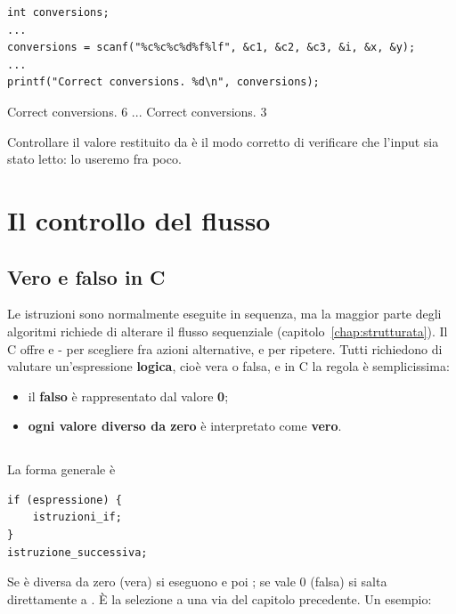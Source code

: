 \begin{affianco}[0.55][c]
\begin{lstlisting}[style=c]
int conversions;
...
conversions = scanf("%c%c%c%d%f%lf", &c1, &c2, &c3, &i, &x, &y);
...
printf("Correct conversions. %d\n", conversions);
\end{lstlisting}
\risultato
\begin{console}
Correct conversions. 6
...
Correct conversions. 3
\end{console}
\end{affianco}

Controllare il valore restituito da  è il modo corretto di
verificare che l'input sia stato letto: lo useremo fra poco.

\section{Il controllo del flusso}

\subsection{Vero e falso in C}

Le istruzioni sono normalmente eseguite in sequenza, ma la maggior parte
degli algoritmi richiede di alterare il flusso sequenziale
(capitolo~\ref{chap:strutturata}). Il C offre  e
- per scegliere fra azioni alternative,  e
 per ripetere. Tutti richiedono di valutare un'espressione
\textbf{logica}, cioè vera o falsa, e in C la regola è semplicissima:

\begin{itemize}
  \item il \textbf{falso} è rappresentato dal valore \textbf{0};
  \item \textbf{ogni valore diverso da zero} è interpretato come
        \textbf{vero}.
\end{itemize}

\subsection{}

La forma generale è

\begin{lstlisting}[style=c]
if (espressione) {
    istruzioni_if;
}
istruzione_successiva;
\end{lstlisting}

Se  è diversa da zero (vera) si eseguono
 e poi ; se vale 0 (falsa)
si salta direttamente a . È la selezione a una
via del capitolo precedente. Un esempio:

